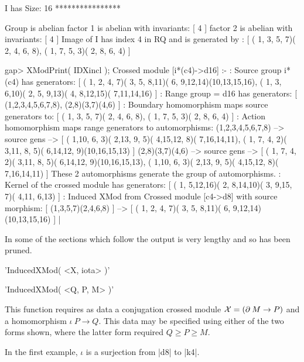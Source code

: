      I has Size: 16
    **************** 

    Group is abelian 
    factor 1 is abelian with invariants: [ 4 ]
    factor 2 is abelian with invariants: [ 4 ]
    Image of I has index 4 in RQ and is generated by :   
    [ ( 1, 3, 5, 7)( 2, 4, 6, 8), ( 1, 7, 5, 3)( 2, 8, 6, 4) ]

    gap> XModPrint( IDXincl );
    Crossed module [i*(c4)->d16] :- 
    : Source group i*(c4) has generators:
      [ ( 1, 2, 4, 7)( 3, 5, 8,11)( 6, 9,12,14)(10,13,15,16), 
        ( 1, 3, 6,10)( 2, 5, 9,13)( 4, 8,12,15)( 7,11,14,16) ]
    : Range group = d16 has generators:
      [ (1,2,3,4,5,6,7,8), (2,8)(3,7)(4,6) ]
    : Boundary homomorphism maps source generators to:
      [ ( 1, 3, 5, 7)( 2, 4, 6, 8), ( 1, 7, 5, 3)( 2, 8, 6, 4) ]
    : Action homomorphism maps range generators to automorphisms:
      (1,2,3,4,5,6,7,8) --> { source gens --> 
    [ ( 1,10, 6, 3)( 2,13, 9, 5)( 4,15,12, 8)( 7,16,14,11), 
      ( 1, 7, 4, 2)( 3,11, 8, 5)( 6,14,12, 9)(10,16,15,13) ] }
      (2,8)(3,7)(4,6) --> { source gens --> 
    [ ( 1, 7, 4, 2)( 3,11, 8, 5)( 6,14,12, 9)(10,16,15,13), 
      ( 1,10, 6, 3)( 2,13, 9, 5)( 4,15,12, 8)( 7,16,14,11) ] }
      These 2 automorphisms generate the group of automorphisms.
    : Kernel of the crossed module has generators:
      [ ( 1, 5,12,16)( 2, 8,14,10)( 3, 9,15, 7)( 4,11, 6,13) ]
    : Induced XMod from Crossed module [c4->d8]  with source morphism:
      [ (1,3,5,7)(2,4,6,8) ]
       --> [ ( 1, 2, 4, 7)( 3, 5, 8,11)( 6, 9,12,14)(10,13,15,16) ]  |

In some of the sections which follow the output is very lengthy and so
has been pruned.
   
%

'InducedXMod( <X, iota> )'

'InducedXMod( <Q, P, M> )'

This function requires as data a  conjugation crossed module ${\cal X}
= (\partial \: M \to P)$ and a homomorphism $\iota  \: P \to Q$.  This
data may  be specified using either of  the two forms shown, where the
latter form required $Q \ge P \ge M$.

In the first example, $\iota$ is a surjection from |d8| to |k4|.

